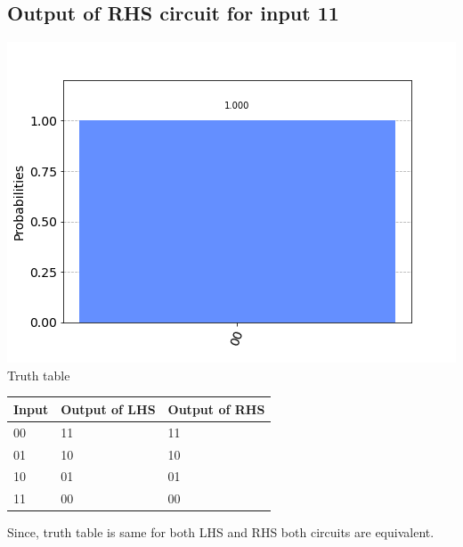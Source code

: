 \documentclass[a4paper]{article}
\begin{document}
\begin{answer}[Question 1 b (d)]
        \subsection*{Output of RHS circuit for input 11}
        \includegraphics[scale = 0.5]{d211-out.png}
        Truth table        
        \begin{center}
            \begin{tabular}{ | m{3cm}| m{3cm} |m{3cm}| } 
                \hline
                Input	&	Output of LHS & Output of RHS \\
                \hline
                00 & 11&11\\
                01 & 10&10\\
                10 & 01&01\\
                11 & 00&00\\
                \hline
            \end{tabular}
        \end{center} 
        Since, truth table is same for both LHS and RHS both circuits are equivalent. 
        
    \end{answer}
\end{document}
